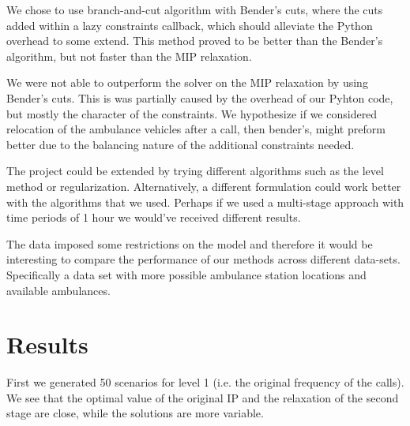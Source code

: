 \documentclass[12pt]{report}
\begin{document}
We chose to use branch-and-cut algorithm with Bender's cuts, where the cuts added within a lazy constraints callback, which should alleviate the Python overhead to some extend.
This method proved to be better than the Bender's algorithm, but not faster than the MIP relaxation.

We were not able to outperform the solver on the MIP relaxation by using  Bender's cuts.
This is was partially caused by the overhead of our Pyhton code, but mostly the character of the constraints. We hypothesize if we considered relocation of the ambulance vehicles after a call, then bender's, might preform better due to the balancing nature of the additional constraints needed.

The project could be extended by trying different algorithms such as the level method or regularization. Alternatively, a different formulation could work better with the algorithms that we used. Perhaps if we used a multi-stage approach with time periods of 1 hour we would've received different results. 

The data imposed some restrictions on the model and therefore it would be interesting to compare the performance of our methods across different data-sets. Specifically a data set with more possible ambulance station locations and available ambulances.

\newpage
\section*{Results}

First we generated 50 scenarios for level 1 (i.e. the original frequency of the calls).
We see that the optimal value of the original IP and the relaxation of the second stage are close, while the solutions are more variable.
\end{document}
